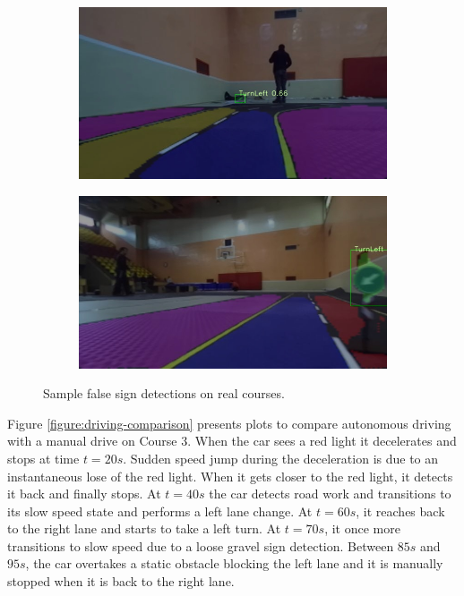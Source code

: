 \begin{figure}[h]
\begin{subfigure}[b]{0.45\linewidth}
  \end{subfigure}
  \begin{subfigure}[b]{0.45\linewidth}
    \includegraphics[width=\linewidth]{figures/experiments/real/fp-turnleft1.jpg}
  \end{subfigure}
  \begin{subfigure}[b]{0.45\linewidth}
    \includegraphics[width=\linewidth]{figures/experiments/real/fp-turnleft2.jpg}
  \end{subfigure}
  \caption[False sign detections on real courses]{Sample false sign
    detections on real courses.}
  \label{figure:real-course-detection-bad}
\end{figure}


Figure \ref{figure:driving-comparison} presents plots to compare autonomous
driving with a manual drive on Course 3. When the car sees a red light it
decelerates and stops at time $t = 20s$. Sudden speed jump during the
deceleration is due to an instantaneous lose of the red light. When it gets
closer to the red light, it detects it back and finally stops. At $t = 40s$ the
car detects road work and transitions to its slow speed state and performs a
left lane change. At $t = 60s$, it reaches back to the right lane and starts to
take a left turn. At $t = 70s$, it once more transitions to slow speed due to a
loose gravel sign detection. Between $85s$ and $95s$, the car overtakes a
static obstacle blocking the left lane and it is manually stopped when it is
back to the right lane.

